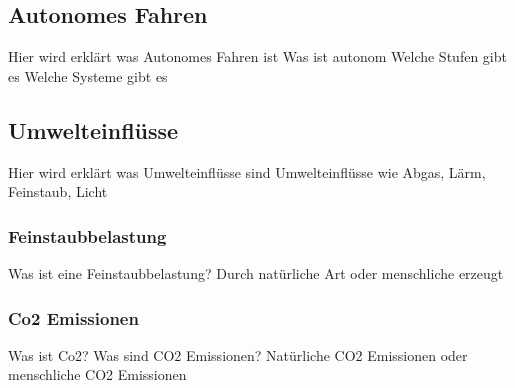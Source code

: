 	      	      	      	      	      
\subsection{Autonomes Fahren}
	      	      	      	      	      
Hier wird erklärt was Autonomes Fahren ist
Was ist autonom 
Welche Stufen gibt es
Welche Systeme gibt es
	      	      	      	      	      
	      	      	      	      	      
\subsection{Umwelteinflüsse}
	      	      	      	      	      
Hier wird erklärt was Umwelteinflüsse sind
Umwelteinflüsse wie Abgas, Lärm, Feinstaub, Licht

\subsubsection{Feinstaubbelastung}
Was ist eine Feinstaubbelastung?
Durch natürliche Art oder menschliche erzeugt
\subsubsection{Co2 Emissionen}
Was ist Co2?
Was sind CO2 Emissionen?
Natürliche CO2 Emissionen oder menschliche CO2 Emissionen
